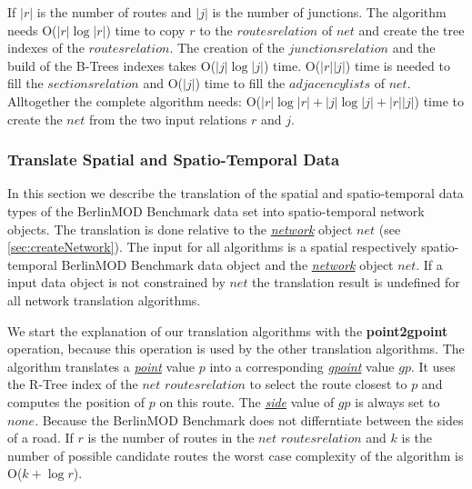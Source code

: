 \documentclass[a4paper]{article}
\newcommand{\bmodb} {BerlinMOD Benchmark}
\newcommand{\op}[1]{\textbf{#1}}
\newcommand{\dt}[1]{\textsl{\underline{#1}}}
\begin{document}
{If $|r|$ is the number of routes and $|j|$ is the number of junctions.
The algorithm needs O($|r| \log |r|$) time to copy $r$ to the
$routes relation$ of $net$ and create the tree indexes of the
$routes relation$. The creation of the $junctions relation$ and the build
of the B-Trees indexes takes O($|j| \log |j|$) time.
O($|r||j|$) time is needed to fill the $sections relation$ and
O($|j|$) time to fill the $adjacency lists$ of $net$. Alltogether
the complete algorithm needs:
O($|r| \log |r|+|j| \log |j| + |r||j|$)
 time to create the $net$ from the two input relations $r$ and $j$.
\subsubsection{Translate Spatial and Spatio-Temporal Data}
\label{sec:translateSTdata}
In this section we describe the translation of the spatial and spatio-temporal
data types of the \bmodb{} data set into spatio-temporal network objects. The
translation is done relative to the \dt{network} object $net$ (see  \ref{sec:createNetwork}).
The input for all algorithms is a spatial respectively
spatio-temporal \bmodb{} data object and the \dt{network} object $net$.
If a input data object is not constrained by $net$ the translation result is
undefined for all network translation algorithms.

We start the explanation of our translation algorithms with the \op{point2gpoint}
operation, because this operation is used by the other translation algorithms.
The algorithm translates a \dt{point} value $p$ into a corresponding
\dt{gpoint} value $gp$. It uses the R-Tree index of the $net$
$routes relation$ to select the route closest to $p$ and computes the
position of $p$ on this route. The \dt{side} value of $gp$ is always set
to $none$. Because the \bmodb{} does not differntiate between the sides of a
road. If $r$ is the number of routes in the $net$ $routes relation$
and $k$ is the number of possible candidate routes the worst case complexity
of the algorithm is O($k + \log r$).

}
\end{document}
